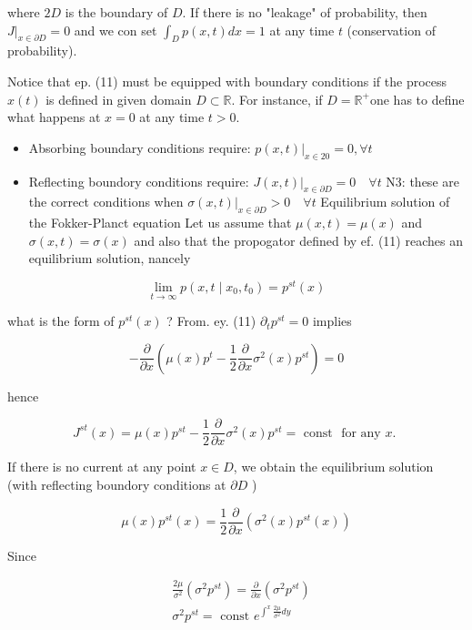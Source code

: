 \documentclass[10pt]{article}
\begin{document}
where $2 D$ is the boundary of $D$. If there is no "leakage" of probability, then $\left.J\right|_{x \in \partial D}=0$ and we con set $\int_{D} p(x, t) d x=1$ at any time $t$ (conservation of probability).

Notice that ep. (11) must be equipped with boundary conditions if the process $x(t)$ is defined in given domain $D \subset \mathbb{R}$. For instance, if $D=\mathbb{R}^{+}$one has to define what happens at $x=0$ at any time $t>0$.

\begin{itemize}
  \item Absorbing boundary conditions require: $\left.p(x, t)\right|_{x \in 20}=0, \forall t$
  \item Reflecting boundory conditions require: $\left.J(x, t)\right|_{x \in \partial D}=0 \quad \forall t$ N3: these are the correct conditions when $\left.\sigma(x, t)\right|_{x \in \partial D}>0 \quad \forall t$ Equilibrium solution of the Fokker-Planct equation Let us assume that $\mu(x, t)=\mu(x)$ and $\sigma(x, t)=\sigma(x)$ and also that the propogator defined by ef. (11) reaches an equilibrium solution, nancely
\end{itemize}

$$
\lim _{t \rightarrow \infty} p\left(x, t \mid x_{0}, t_{0}\right)=p^{s t}(x)
$$

what is the form of $p^{s t}(x)$ ? From. ey. (11) $\partial_{t} p^{s t}=0$ implies

$$
-\frac{\partial}{\partial x}\left(\mu(x) p^{t}-\frac{1}{2} \frac{\partial}{\partial x} \sigma^{2}(x) p^{s t}\right)=0
$$

hence

$$
J^{s t}(x)=\mu(x) p^{s t}-\frac{1}{2} \frac{\partial}{\partial x} \sigma^{2}(x) p^{s t}=\text { const } \text { for any } x \text {. }
$$

If there is no current at any point $x \in D$, we obtain the equilibrium solution (with reflecting boundory conditions at $\partial D$ )

$$
\mu(x) p^{s t}(x)=\frac{1}{2} \frac{\partial}{\partial x}\left(\sigma^{2}(x) p^{s t}(x)\right)
$$

Since

$$
\begin{aligned}
& \frac{2 \mu}{\sigma^{2}}\left(\sigma^{2} p^{s t}\right)=\frac{\partial}{\partial x}\left(\sigma^{2} p^{s t}\right) \\
& \sigma^{2} p^{s t}=\text { const } e^{\int^{x} \frac{2 \mu}{\sigma^{2}} d y}
\end{aligned}
$$
\end{document}
